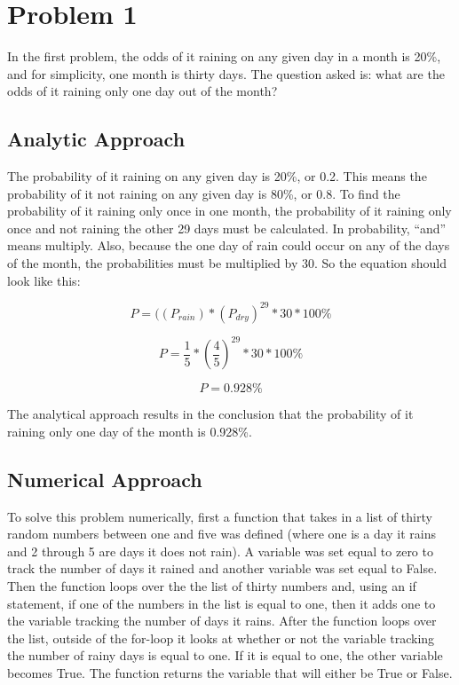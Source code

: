 \documentclass[12pt]{article}
\begin{document}
\section{Problem 1}

	In the first problem, the odds of it raining on any given day in a month is 20\%, and
	for simplicity, one month is thirty days. The question asked is: what are the odds of it 
	raining only one day out of the month?
	
	\subsection{Analytic Approach}
	
	The probability of it raining on any given day is 20\%, or 0.2. This means the probability
	of it not raining on any given day is 80\%, or 0.8. To find the probability of it raining only 
	once in one month, the probability of it raining only once and not raining the other 29
	days must be calculated. In probability, ``and'' means multiply. Also, because the one 
	day of rain could occur on any of the days of the month, the probabilities must be 
	multiplied by 30. So the equation should look like this: 
	
	$$P = ((P_{rain}) * (P_{dry})^{29} * 30* 100\%$$
	
	$$P = \frac{1}{5} * (\frac{4}{5})^{29} * 30 * 100\%$$
	
	$$P = 0.928\%$$
	
	The analytical approach results in the conclusion that the probability of it raining only 
	one day of the month is 0.928\%.
	
	\subsection{Numerical Approach}
	
	To solve this problem numerically, first a function
	that takes in a list of thirty random numbers between one and five was defined (where 
	one is a day it rains and 2 through 5 are days it does not rain).  A variable was set
	equal to zero to track the number of days it rained and another variable was set equal 
	to False. Then the function loops over the the list of thirty numbers and, using an if 
	statement, if one of the numbers in the list is equal to one, then it adds one to the 
	variable tracking the number of days it rains. After the function loops over the list, 
	outside of the for-loop it looks at whether or not the variable 
	tracking the number of rainy days is equal to one. If it is equal to one, the other variable 
	becomes True. The function returns the variable that will either be True or False.
	
\end{document}
